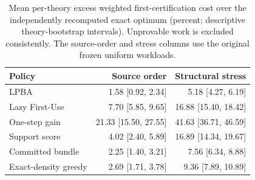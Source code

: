 \begin{table}[H]
\caption{Mean per-theory excess weighted first-certification cost over the independently recomputed exact optimum (percent; descriptive theory-bootstrap intervals). Unprovable work is excluded consistently. The source-order and stress columns use the original frozen uniform workloads.\label{tab:completion}}
\centering\small\renewcommand{\arraystretch}{1.08}
\begin{tabular}{lrr}
\toprule
Policy & Source order & Structural stress \\
\midrule
LPBA & 1.58 [0.92, 2.34] & 5.18 [4.27, 6.19] \\
Lazy First-Use & 7.70 [5.85, 9.65] & 16.88 [15.40, 18.42] \\
One-step gain & 21.33 [15.50, 27.55] & 41.63 [36.71, 46.59] \\
Support score & 4.02 [2.40, 5.89] & 16.89 [14.34, 19.67] \\
Committed bundle & 2.25 [1.40, 3.21] & 7.56 [6.34, 8.88] \\
Exact-density greedy & 2.69 [1.71, 3.78] & 9.36 [7.89, 10.89] \\
\bottomrule
\end{tabular}
\end{table}
